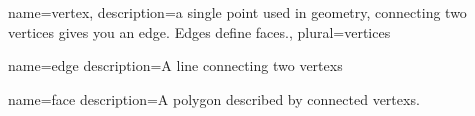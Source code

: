 {
  name=vertex,
  description={a single point used in geometry, connecting two vertices gives you an \gls{edge}. \glspl{Edge} define \glspl{face}.},
  plural=vertices
}

{
  name=edge
  description={A line connecting two \glspl{vertex}}
}

{
  name=face
  description={A polygon described by connected \glspl{vertex}.}
}